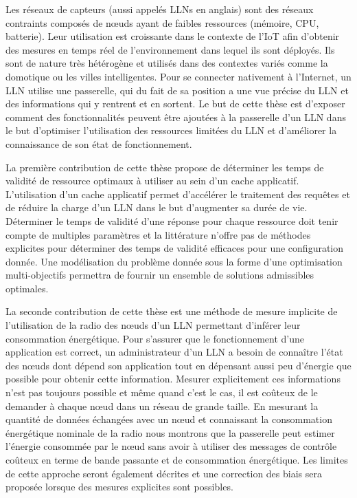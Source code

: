 {%


Les réseaux de capteurs (aussi appelés \ac{LLN}s en anglais) sont des réseaux contraints composés de nœuds ayant de faibles ressources (mémoire, CPU, batterie).
Leur utilisation est croissante dans le contexte de l'\ac{IoT} afin d'obtenir des mesures en temps réel de l'environnement dans lequel ils sont déployés.
Ils sont de nature très hétérogène et utilisés dans des contextes variés comme la domotique ou les villes intelligentes.
Pour se connecter nativement à l'Internet, un \ac{LLN} utilise une passerelle, qui du fait de sa position a une vue précise du \ac{LLN} et des informations qui y rentrent et en sortent.
Le but de cette thèse est d'exposer comment des fonctionnalités peuvent être ajoutées à la passerelle d'un \ac{LLN} dans le but d'optimiser l'utilisation des ressources limitées du \ac{LLN} et d'améliorer la connaissance de son état de fonctionnement.

La première contribution de cette thèse propose de déterminer les temps de validité de ressource optimaux à utiliser au sein d'un cache applicatif. 
L'utilisation d'un cache applicatif permet d'accélérer le traitement des requêtes et de réduire la charge d'un \ac{LLN} dans le but d'augmenter sa durée de vie.
Déterminer le temps de validité d'une réponse pour chaque ressource doit tenir compte de multiples paramètres et la littérature n'offre pas de méthodes explicites pour déterminer des temps de validité efficaces pour une configuration donnée.
Une modélisation du problème donnée sous la forme d'une optimisation multi-objectifs permettra de fournir un ensemble de solutions admissibles optimales.

La seconde contribution de cette thèse est une méthode de mesure implicite de l'utilisation de la radio des nœuds d'un \ac{LLN} permettant d'inférer leur consommation énergétique.
Pour s'assurer que le fonctionnement d'une application est correct, un administrateur d'un \ac{LLN} a besoin de connaître l'état des nœuds dont dépend son application tout en dépensant aussi peu d'énergie que possible pour obtenir cette information.
Mesurer explicitement ces informations n'est pas toujours possible et même quand c'est le cas, il est coûteux de le demander à chaque nœud dans un réseau de grande taille.
En mesurant la quantité de données échangées avec un nœud et connaissant la consommation énergétique nominale de la radio nous montrons que la passerelle peut estimer l'énergie consommée par le nœud sans avoir à utiliser des messages de contrôle coûteux en terme de bande passante et de consommation énergétique.
Les limites de cette approche seront également décrites et une correction des biais sera proposée lorsque des mesures explicites sont possibles.

}
